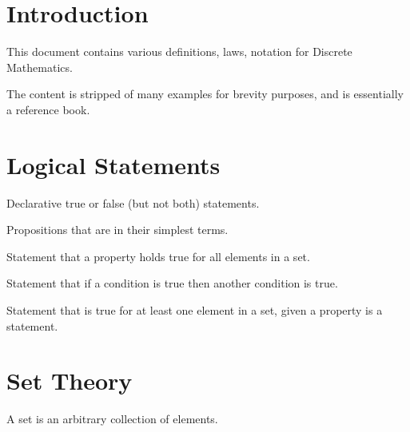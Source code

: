 \documentclass[11pt]{article}
\begin{document}



\tableofcontents

\section{Introduction}

This document contains various definitions, laws, notation for Discrete Mathematics.

The content is stripped of many examples for brevity purposes, and is essentially a reference book.

\section{Logical Statements}

\begin{definition}[Propositions]\label{def:props}
Declarative true or false (but not both) statements.
\end{definition}

\begin{definition}\label{def:prims}
Propositions that are in their simplest terms.
\end{definition}

\begin{definition}\label{def:universal-stmts}
Statement that a property holds true for all elements in a set.
\end{definition}

\begin{definition}\label{def:cond-stmts}
Statement that if a condition is true then another condition is true.
\end{definition}

\begin{definition}\label{def:exist-stmts}
Statement that is true for at least one element in a set, given a property is a statement.
\end{definition}

\section{Set Theory}

\begin{definition}[Set]\label{def:set}
    A set is an arbitrary collection of elements.
\end{definition}
\end{document}
